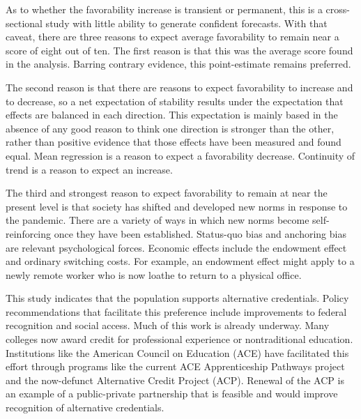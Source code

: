 \documentclass[review]{elsarticle}
\begin{document}
As to whether the favorability increase is transient or permanent,
this is a cross-sectional study with little ability to generate confident forecasts.
With that caveat, there are three reasons to expect average favorability to remain near a score of eight out of ten.
The first reason is that this was the average score found in the analysis.
Barring contrary evidence, this point-estimate remains preferred.

The second reason is that there are reasons to expect favorability to increase and to decrease,
so a net expectation of stability results under the expectation that effects are balanced in each direction.
This expectation is mainly based in the absence of any good reason to think one direction is stronger than the other,
rather than positive evidence that those effects have been measured and found equal.
Mean regression is a reason to expect a favorability decrease.
Continuity of trend is a reason to expect an increase.

The third and strongest reason to expect favorability to remain at near the present level is that
society has shifted and developed new norms in response to the pandemic.
There are a variety of ways in which new norms become self-reinforcing once they have been established.
Status-quo bias and anchoring bias are relevant psychological forces.
Economic effects include the endowment effect and ordinary switching costs.
For example, an endowment effect might apply to a newly remote worker who is now loathe to return to a physical office.

This study indicates that the population supports alternative credentials.
Policy recommendations that facilitate this preference include improvements to federal recognition and social access.
Much of this work is already underway.
Many colleges now award credit for professional experience or nontraditional education.
Institutions like the American Council on Education (ACE)
have facilitated this effort through programs like the current ACE Apprenticeship Pathways project
and the now-defunct Alternative Credit Project (ACP). %
Renewal of the ACP is an example of a public-private partnership that is feasible and would improve recognition of alternative credentials.
\end{document}

